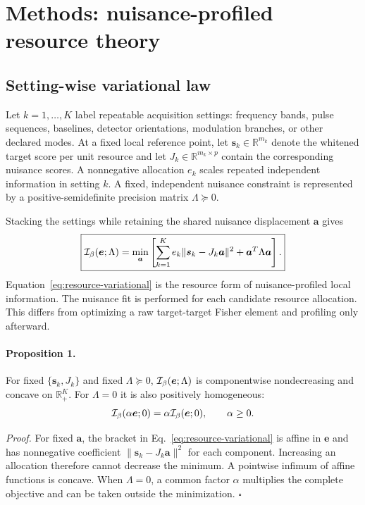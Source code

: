 \section{Methods: nuisance-profiled resource theory}
\label{sec:resource-theory}

\subsection{Setting-wise variational law}

Let $k=1,\ldots,K$ label repeatable acquisition settings: frequency bands, pulse sequences, baselines, detector orientations, modulation branches, or other declared modes. At a fixed local reference point, let $\bm s_k\in\mathbb R^{m_k}$ denote the whitened target score per unit resource and let $J_k\in\mathbb R^{m_k\times p}$ contain the corresponding nuisance scores. A nonnegative allocation $e_k$ scales repeated independent information in setting $k$. A fixed, independent nuisance constraint is represented by a positive-semidefinite precision matrix $\Lambda\succeq0$.

Stacking the settings while retaining the shared nuisance displacement $\bm a$ gives
\begin{equation}
\boxed{
\mathcal I_{\beta}(\bm e;\Lambda)=
\min_{\bm a}
\left[
\sum_{k=1}^{K}e_k\|\bm s_k-J_k\bm a\|^2
+\bm a^T\Lambda\bm a
\right].
}
\label{eq:resource-variational}
\end{equation}
Equation~\eqref{eq:resource-variational} is the resource form of nuisance-profiled local information. The nuisance fit is performed for each candidate resource allocation. This differs from optimizing a raw target-target Fisher element and profiling only afterward.

\paragraph*{Proposition 1.}
For fixed $\{\bm s_k,J_k\}$ and fixed $\Lambda\succeq0$, $\mathcal I_{\beta}(\bm e;\Lambda)$ is componentwise nondecreasing and concave on $\mathbb R_+^K$. For $\Lambda=0$ it is also positively homogeneous:
\begin{equation}
\mathcal I_{\beta}(\alpha\bm e;0)=\alpha\mathcal I_{\beta}(\bm e;0),\qquad \alpha\ge0.
\label{eq:homogeneity}
\end{equation}

\emph{Proof.} For fixed $\bm a$, the bracket in Eq.~\eqref{eq:resource-variational} is affine in $\bm e$ and has nonnegative coefficient $\|\bm s_k-J_k\bm a\|^2$ for each component. Increasing an allocation therefore cannot decrease the minimum. A pointwise infimum of affine functions is concave. When $\Lambda=0$, a common factor $\alpha$ multiplies the complete objective and can be taken outside the minimization. \hfill$\square$

